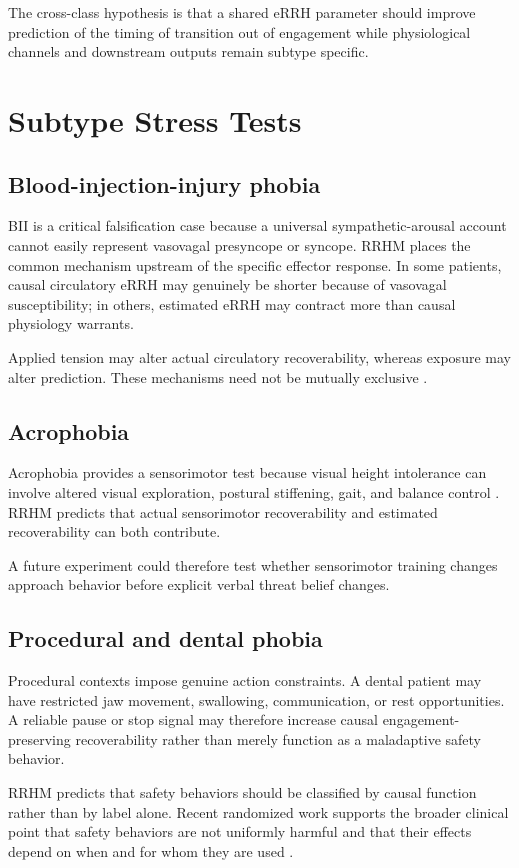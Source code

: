\documentclass[9pt,twocolumn]{article}
\begin{document}
The cross-class hypothesis is that a shared eRRH parameter should improve prediction of the timing of transition out of engagement while physiological channels and downstream outputs remain subtype specific.

\section{Subtype Stress Tests}
\subsection{Blood-injection-injury phobia}
BII is a critical falsification case because a universal sympathetic-arousal account cannot easily represent vasovagal presyncope or syncope. RRHM places the common mechanism upstream of the specific effector response. In some patients, causal circulatory eRRH may genuinely be shorter because of vasovagal susceptibility; in others, estimated eRRH may contract more than causal physiology warrants.

Applied tension may alter actual circulatory recoverability, whereas exposure may alter prediction. These mechanisms need not be mutually exclusive \cite{ayala2009,ritz2010,ducasse2013}.

\subsection{Acrophobia}
Acrophobia provides a sensorimotor test because visual height intolerance can involve altered visual exploration, postural stiffening, gait, and balance control \cite{huppert2020,wuehr2015}. RRHM predicts that actual sensorimotor recoverability and estimated recoverability can both contribute.

A future experiment could therefore test whether sensorimotor training changes approach behavior before explicit verbal threat belief changes.

\subsection{Procedural and dental phobia}
Procedural contexts impose genuine action constraints. A dental patient may have restricted jaw movement, swallowing, communication, or rest opportunities. A reliable pause or stop signal may therefore increase causal engagement-preserving recoverability rather than merely function as a maladaptive safety behavior.

RRHM predicts that safety behaviors should be classified by causal function rather than by label alone. Recent randomized work supports the broader clinical point that safety behaviors are not uniformly harmful and that their effects depend on when and for whom they are used \cite{meckes2025}.
\end{document}

